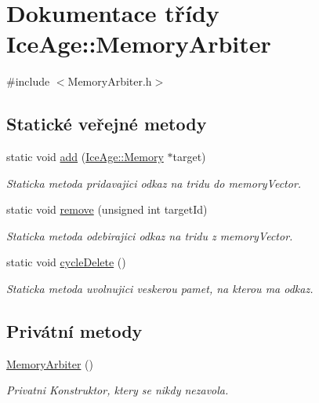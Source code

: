 \hypertarget{classIceAge_1_1MemoryArbiter}{}\section{Dokumentace třídy Ice\+Age\+:\+:Memory\+Arbiter}
\label{classIceAge_1_1MemoryArbiter}


{\ttfamily \#include $<$Memory\+Arbiter.\+h$>$}

\subsection*{Statické veřejné metody}
\begin{DoxyCompactItemize}
\item 
static void \hyperlink{classIceAge_1_1MemoryArbiter_a219f22e94979f934a63a0fd28ef889f7}{add} (\hyperlink{classIceAge_1_1Memory}{Ice\+Age\+::\+Memory} $\ast$target)
\begin{DoxyCompactList}\small\item\em Staticka metoda pridavajici odkaz na tridu do memory\+Vector. \end{DoxyCompactList}\item 
static void \hyperlink{classIceAge_1_1MemoryArbiter_a15d44df0d0b3053548af55f5568f8792}{remove} (unsigned int target\+Id)
\begin{DoxyCompactList}\small\item\em Staticka metoda odebirajici odkaz na tridu z memory\+Vector. \end{DoxyCompactList}\item 
static void \hyperlink{classIceAge_1_1MemoryArbiter_ae3460492678cf992629f4a70de3ef1ca}{cycle\+Delete} ()
\begin{DoxyCompactList}\small\item\em Staticka metoda uvolnujici veskerou pamet, na kterou ma odkaz. \end{DoxyCompactList}\end{DoxyCompactItemize}
\subsection*{Privátní metody}
\begin{DoxyCompactItemize}
\item 
\hyperlink{classIceAge_1_1MemoryArbiter_a1e6bf2eef9d3fb964f6665b94f011024}{Memory\+Arbiter} ()
\begin{DoxyCompactList}\small\item\em Privatni Konstruktor, ktery se nikdy nezavola. \end{DoxyCompactList}\end{DoxyCompactItemize}
